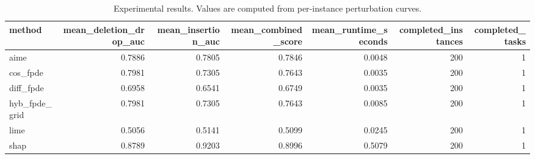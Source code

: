 \begin{table}[t]
\caption{Experimental results. Values are computed from per-instance perturbation curves.}
\label{tab:main_results_computed}
\centering
\begin{tabular}{lrrrrrr}
\toprule
method & mean\_deletion\_drop\_auc & mean\_insertion\_auc & mean\_combined\_score & mean\_runtime\_seconds & completed\_instances & completed\_tasks \\
\midrule
aime & 0.7886 & 0.7805 & 0.7846 & 0.0048 & 200 & 1 \\
cos\_fpde & 0.7981 & 0.7305 & 0.7643 & 0.0035 & 200 & 1 \\
diff\_fpde & 0.6958 & 0.6541 & 0.6749 & 0.0035 & 200 & 1 \\
hyb\_fpde\_grid & 0.7981 & 0.7305 & 0.7643 & 0.0085 & 200 & 1 \\
lime & 0.5056 & 0.5141 & 0.5099 & 0.0245 & 200 & 1 \\
shap & 0.8789 & 0.9203 & 0.8996 & 0.5079 & 200 & 1 \\
\bottomrule
\end{tabular}

\end{table}
